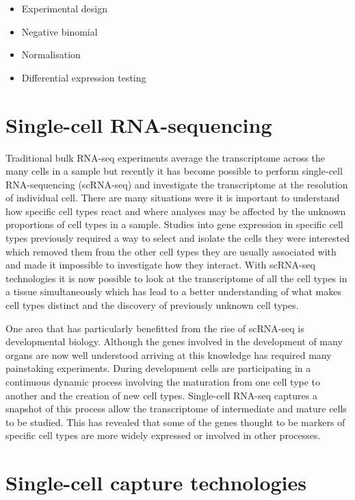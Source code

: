 \documentclass[11pt,a4paper,titlepage,twoside,openright]{style/unimelbthesis}
\theoremstyle{definition}
\theoremstyle{definition}
\theoremstyle{definition}
\theoremstyle{remark}
\begin{document}
\begin{mainmatter}
\begin{itemize}
\tightlist
\item
  Experimental design
\item
  Negative binomial
\item
  Normalisation
\item
  Differential expression testing
\end{itemize}

\hypertarget{single-cell-rna-sequencing}{%
\section{Single-cell RNA-sequencing}\label{single-cell-rna-sequencing}}

Traditional bulk RNA-seq experiments average the transcriptome across the many cells in a sample but recently it has become possible to perform single-cell RNA-sequencing (scRNA-seq) and investigate the transcriptome at the resolution of individual cell. There are many situations were it is important to understand how specific cell types react and where analyses may be affected by the unknown proportions of cell types in a sample. Studies into gene expression in specific cell types previously required a way to select and isolate the cells they were interested which removed them from the other cell types they are usually associated with and made it impossible to investigate how they interact. With scRNA-seq technologies it is now possible to look at the transcriptome of all the cell types in a tissue simultaneously which has lead to a better understanding of what makes cell types distinct and the discovery of previously unknown cell types.

One area that has particularly benefitted from the rise of scRNA-seq is developmental biology. Although the genes involved in the development of many organs are now well understood arriving at this knowledge has required many painstaking experiments. During development cells are participating in a continuous dynamic process involving the maturation from one cell type to another and the creation of new cell types. Single-cell RNA-seq captures a snapshot of this process allow the transcriptome of intermediate and mature cells to be studied. This has revealed that some of the genes thought to be markers of specific cell types are more widely expressed or involved in other processes.

\hypertarget{single-cell-capture-technologies}{%
\section{Single-cell capture technologies}\label{single-cell-capture-technologies}}


\end{mainmatter}
\end{document}
